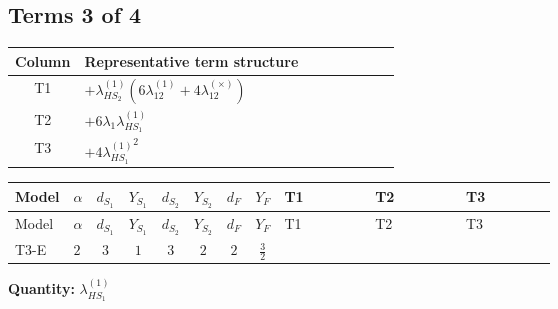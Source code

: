 \documentclass[8pt]{article}
\begin{document}
\begin{landscape}
\subsection*{Terms 3 of 4}
\begin{center}
\begin{tabular}{@{}c >{\raggedright\arraybackslash}p{0.82\linewidth}@{}}
\toprule
Column & Representative term structure \\
\midrule
T1 & \(\displaystyle +{\lambda_{HS_2}^{(1)}} (6 {\lambda_{12}^{(1)}}+4 {\lambda_{12}^{(\times)}})\) \\
\midrule
T2 & \(\displaystyle +6 {\lambda_1} {\lambda_{HS_1}^{(1)}}\) \\
\midrule
T3 & \(\displaystyle +4 {\lambda_{HS_1}^{(1)}}^2\) \\
\midrule
\bottomrule
\end{tabular}
\end{center}
\smallskip
\tiny
\begin{longtable}{@{}llcccccc >{\raggedright\arraybackslash}p{0.21\linewidth} >{\raggedright\arraybackslash}p{0.21\linewidth} >{\raggedright\arraybackslash}p{0.21\linewidth}@{}}
\toprule
Model & $\alpha$ & $d_{S_1}$ & $Y_{S_1}$ & $d_{S_2}$ & $Y_{S_2}$ & $d_F$ & $Y_F$ & T1 & T2 & T3 \\
\midrule
\endfirsthead
\toprule
Model & $\alpha$ & $d_{S_1}$ & $Y_{S_1}$ & $d_{S_2}$ & $Y_{S_2}$ & $d_F$ & $Y_F$ & T1 & T2 & T3 \\
\midrule
\endhead
T3-E & $2$ & $3$ & $1$ & $3$ & $2$ & $2$ & $\frac{3}{2}$ & \scriptsize\adjustbox{max width=\linewidth}{$\begin{gathered} +{\lambda_{HS_2}^{(1)}} (6 {\lambda_{12}^{(1)}}+4 {\lambda_{12}^{(\times)}})\end{gathered}$} & \scriptsize\adjustbox{max width=\linewidth}{$\begin{gathered} +6 {\lambda_1} {\lambda_{HS_1}^{(1)}}\end{gathered}$} & \scriptsize\adjustbox{max width=\linewidth}{$\begin{gathered} +4 {\lambda_{HS_1}^{(1)}}^2\end{gathered}$} \\
\midrule
\bottomrule
\end{longtable}
\clearpage
\noindent\textbf{Quantity: }$\lambda_{HS_1}^{(1)}$\par\smallskip

\end{landscape}
\end{document}
